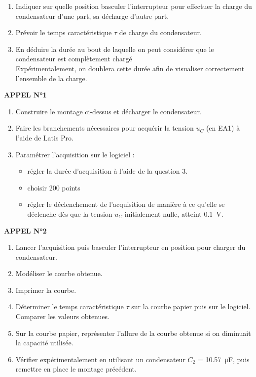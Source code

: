 \documentclass[a4paper,12pt,fleqn]{scrartcl}%
\begin{document}
\begin{enumerate}
	\item Indiquer sur quelle position basculer l'interrupteur pour effectuer la charge du condensateur d'une part, sa décharge d'autre part.
	\item Prévoir le temps caractéristique $\tau$ de charge du condensateur.
	\item En déduire la durée au bout de laquelle on peut considérer que le condensateur est complètement chargé\\ Expérimentalement, on doublera cette durée afin de visualiser correctement l'ensemble de la charge.
\end{enumerate}	
	\begin{center}
		\textbf{APPEL N°1}
	\end{center}
\begin{enumerate}[resume]
	\item Construire le montage ci-dessus et décharger le condensateur.
	\item Faire les branchements nécessaires pour acquérir la tension $u_C$ (en EA1) à l'aide de Latis Pro.
	\item Paramétrer l'acquisition sur le logiciel :
		\begin{itemize}
			\item régler la durée d'acquisition à l'aide de la question 3.
			\item choisir 200 points
			\item régler le déclenchement de l'acquisition de manière à ce qu'elle se déclenche dès que la tension $u_C$ initialement nulle, atteint \SI{0,1}{\volt}.
		\end{itemize}
\end{enumerate}
\begin{center}
	\textbf{APPEL N°2}
\end{center}
\begin{enumerate}[resume]
	\item Lancer l'acquisition puis basculer l'interrupteur en position pour charger du condensateur.
	\item Modéliser le courbe obtenue.
	\item Imprimer la courbe.
	\item Déterminer le temps caractéristique $\tau$ sur la courbe papier puis sur le logiciel. Comparer les valeurs obtenues.
	\item Sur la courbe papier, représenter l'allure de la courbe obtenue si on diminuait la capacité utilisée.
	\item Vérifier expérimentalement en utilisant un condensateur $C_2$ = \SI{10,57}{\micro\farad}, puis remettre en place le montage précédent.
\end{enumerate}
\end{document}

